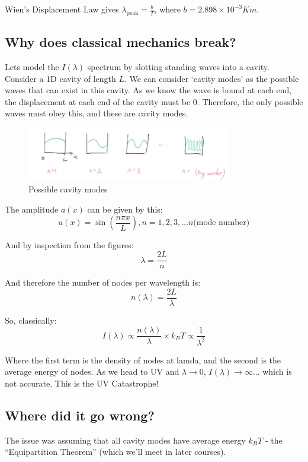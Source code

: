 Wien's Displacement Law gives $\lambda_{\text{peak}} = \frac{b}{T}$, where $b = 2.898 \times 10^{-3} Km$.

\subsection*{Why does classical mechanics break?}

Lets model the $I(\lambda)$ spectrum by slotting standing waves into a cavity. Consider a 1D cavity of length $L$. We can consider `cavity modes' as the possible waves that can exist in this cavity. As we know the wave is bound at each end, the displacement at each end of the cavity must be $0$. Therefore, the only possible waves must obey this, and these are cavity modes.

\begin{figure}[H]
    \centering
    \includegraphics[width=0.8\textwidth]{figures/lec02-03.png}
     \caption{Possible cavity modes}
\end{figure}

The amplitude $a(x)$ can be given by this:
\[
    a(x) = \sin \left(\frac{n \pi x}{L}\right), n = 1, 2, 3, \ldots n \text{(mode number)}
\]

And by inspection from the figures:
\[
    \lambda = \frac{2L}{n}
\]

And therefore the number of nodes per wavelength is:
\[
    n(\lambda) = \frac{2L}{\lambda}
\]

So, classically:
\[
    I(\lambda) \propto \frac{n(\lambda)}{\lambda} \times k_B T \propto \frac{1}{\lambda^2}
\]

Where the first term is the density of nodes at lamda, and the second is the average energy of nodes. As we head to UV and $\lambda \to 0$, $I(\lambda) \to \infty$... which is not accurate. This is the UV Catastrophe!


\subsection*{Where did it go wrong?}
The issue was assuming that all cavity modes have average energy $k_B T$ - the ``Equipartition Theorem'' (which we'll meet in later courses).


